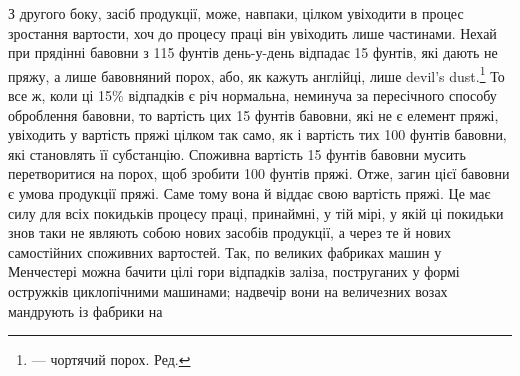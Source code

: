 З другого боку, засіб продукції, може, навпаки, цілком увіходити
в процес зростання вартости, хоч до процесу праці він
увіходить лише частинами. Нехай при прядінні бавовни з 115 фунтів
день-у-день відпадає 15 фунтів, які дають не пряжу,
а лише бавовняний порох, або, як кажуть англійці, лише devil’s
dust.\footnote*{
— чортячий порох. Ред.
} То все ж, коли ці 15\% відпадків є річ нормальна, неминуча
за пересічного способу оброблення бавовни, то вартість цих
15 фунтів бавовни, які не є елемент пряжі, увіходить у вартість
пряжі цілком так само, як і вартість тих 100 фунтів бавовни,
які становлять її субстанцію. Споживна вартість 15 фунтів бавовни
мусить перетворитися на порох, щоб зробити 100 фунтів
пряжі. Отже, загин цієї бавовни є умова продукції пряжі. Саме
тому вона й віддає свою вартість пряжі. Це має силу для всіх
покидьків процесу праці, принаймні, у тій мірі, у якій ці покидьки
знов таки не являють собою нових засобів продукції, а через
те й нових самостійних споживних вартостей. Так, по великих
фабриках машин у Менчестері можна бачити цілі гори відпадків
заліза, поструганих у формі остружків циклопічними машинами;
надвечір вони на величезних возах мандрують із фабрики на
\parbreak{}  %
